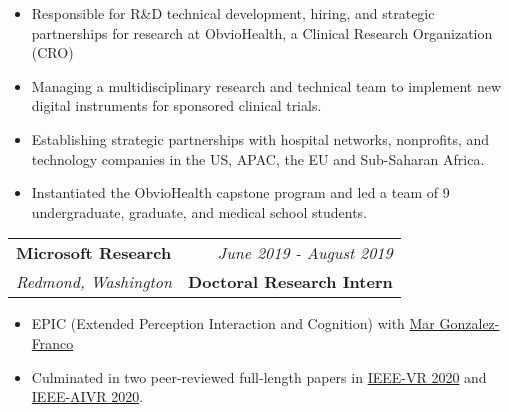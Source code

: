 \documentclass[10pt,a4paper]{article}
\begin{document}
  \vspace*{1mm}\noindent\begin{minipage}{17cm}
    \begin{itemize}[leftmargin=6mm,topsep=0mm,itemsep=-1mm]
      \item Responsible for R\&D technical development, hiring, and strategic partnerships for research at ObvioHealth, a Clinical Research Organization (CRO)
      \item Managing a multidisciplinary research and technical team to implement new digital instruments for sponsored clinical trials.
      \item Establishing strategic partnerships with hospital networks, nonprofits, and technology companies in the US, APAC, the EU and Sub-Saharan Africa.
      \item Instantiated the ObvioHealth capstone program and led a team of 9 undergraduate, graduate, and medical school students.
    \end{itemize}
  \end{minipage}

  \vspace*{2mm}\setlength\parindent{2mm}


    \noindent\begin{tabularx}{17cm}{X r}
    \textbf{Microsoft Research} & \textit{June 2019 - August 2019} \\
    \textit{Redmond, Washington} & \textbf{Doctoral Research Intern} \\
  \end{tabularx}

  \vspace*{1mm}\noindent\begin{minipage}{17cm}
    \begin{itemize}[leftmargin=6mm,topsep=0mm,itemsep=-1mm]
      \item EPIC (Extended Perception Interaction and Cognition) with \href{https://www.microsoft.com/en-us/research/people/margon/}{Mar Gonzalez-Franco}
      \item Culminated in two peer-reviewed full-length papers in \href{https://github.com/bc/resume/raw/master/papers/gonzalez-franco_et_al_ieeevr_2020.pdf}{IEEE-VR 2020} and \href{https://github.com/bc/resume/raw/master/papers/cohn_et_al_aivr_2020_snapmov.pdf}{IEEE-AIVR 2020}.
    \end{itemize}
  \end{minipage}
\end{document}
